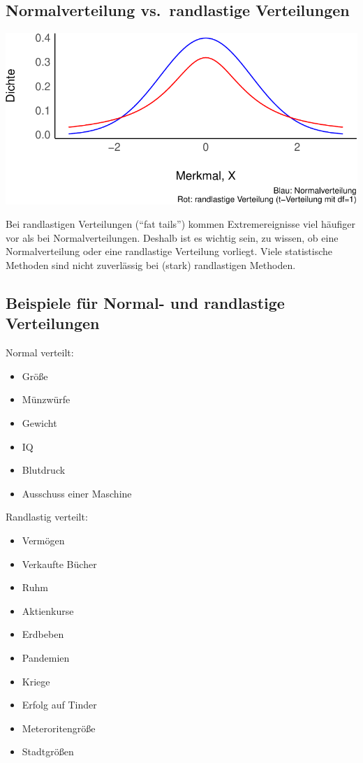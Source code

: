 \documentclass[
  a4paper,
  DIV=11]{scrreprt}
\providecommand{\tightlist}{%
  \setlength{\itemsep}{0pt}\setlength{\parskip}{0pt}}\usepackage{longtable,booktabs,array}
\theoremstyle{definition}
\theoremstyle{remark}
\begin{document}
\hypertarget{normalverteilung-vs.-randlastige-verteilungen}{%
\subsection{Normalverteilung vs.~randlastige
Verteilungen}\label{normalverteilung-vs.-randlastige-verteilungen}}

\includegraphics{./Verteilungen_files/figure-pdf/Normalverteilung-9-1.pdf}

Bei randlastigen Verteilungen (``fat tails'') kommen Extremereignisse
viel häufiger vor als bei Normalverteilungen. Deshalb ist es wichtig
sein, zu wissen, ob eine Normalverteilung oder eine randlastige
Verteilung vorliegt. Viele statistische Methoden sind nicht zuverlässig
bei (stark) randlastigen Methoden.

\hypertarget{beispiele-fuxfcr-normal--und-randlastige-verteilungen}{%
\subsection{Beispiele für Normal- und randlastige
Verteilungen}\label{beispiele-fuxfcr-normal--und-randlastige-verteilungen}}

Normal verteilt:

\begin{itemize}
\tightlist
\item
  Größe
\item
  Münzwürfe
\item
  Gewicht
\item
  IQ
\item
  Blutdruck
\item
  Ausschuss einer Maschine
\end{itemize}

Randlastig verteilt:

\begin{itemize}
\tightlist
\item
  Vermögen
\item
  Verkaufte Bücher
\item
  Ruhm
\item
  Aktienkurse
\item
  Erdbeben
\item
  Pandemien
\item
  Kriege
\item
  Erfolg auf Tinder
\item
  Meteroritengröße
\item
  Stadtgrößen
\end{itemize}
\end{document}
